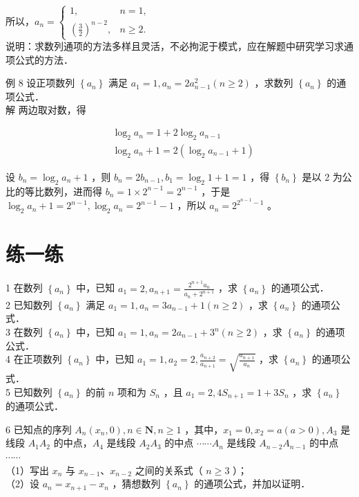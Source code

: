 \documentclass[10pt]{article}
\begin{document}
所以，\(a_{n}= \begin{cases}1, & n=1, \\ \left(\frac{3}{2}\right)^{n-2}, & n \geqslant 2 .\end{cases}\)\\
说明：求数列通项的方法多样且灵活，不必拘泥于模式，应在解题中研究学习求通项公式的方法．

例 8 设正项数列 \(\left\{a_{n}\right\}\) 满足 \(a_{1}=1, a_{n}=2 a_{n-1}^{2}(n \geqslant 2)\) ，求数列 \(\left\{a_{n}\right\}\) 的通项公式．\\
解 两边取对数，得

\[
\begin{aligned}
& \log _{2} a_{n}=1+2 \log _{2} a_{n-1} \\
& \log _{2} a_{n}+1=2\left(\log _{2} a_{n-1}+1\right)
\end{aligned}
\]

设 \(b_{n}=\log _{2} a_{n}+1\) ，则 \(b_{n}=2 b_{n-1}, b_{1}=\log _{2} 1+1=1\) ，得 \(\left\{b_{n}\right\}\) 是以 2 为公比的等比数列，进而得 \(b_{n}=1 \times 2^{n-1}=2^{n-1}\) ，于是 \(\log _{2} a_{n}+1=2^{n-1}, \log _{2} a_{n}=2^{n-1}-1\) ，所以 \(a_{n}=2^{2^{n-1}-1}\) 。

\section*{练一练}
1 在数列 \(\left\{a_{n}\right\}\) 中，已知 \(a_{1}=2, a_{n+1}=\frac{2^{n+1} a_{n}}{a_{n}+2^{n+1}}\) ，求 \(\left\{a_{n}\right\}\) 的通项公式．\\
2 已知数列 \(\left\{a_{n}\right\}\) 满足 \(a_{1}=1, a_{n}=3 a_{n-1}+1(n \geqslant 2)\) ，求 \(\left\{a_{n}\right\}\) 的通项公式．\\
3 在数列 \(\left\{a_{n}\right\}\) 中，已知 \(a_{1}=1, a_{n}=2 a_{n-1}+3^{n}(n \geqslant 2)\) ，求 \(\left\{a_{n}\right\}\) 的通项公式．\\
4 在正项数列 \(\left\{a_{n}\right\}\) 中，已知 \(a_{1}=1, a_{2}=2, \frac{a_{n+2}}{a_{n+1}}=\sqrt{\frac{a_{n+1}}{a_{n}}}\) ，求 \(\left\{a_{n}\right\}\) 的通项公式．\\
5 已知数列 \(\left\{a_{n}\right\}\) 的前 \(n\) 项和为 \(S_{n}\) ，且 \(a_{1}=2,4 S_{n+1}=1+3 S_{n}\) ，求 \(\left\{a_{n}\right\}\) 的通项公式．

6 已知点的序列 \(A_{n}\left(x_{n}, 0\right), n \in \mathbf{N}, n \geqslant 1\) ，其中，\(x_{1}=0, x_{2}=a(a>0), A_{3}\) 是线段 \(A_{1} A_{2}\) 的中点，\(A_{4}\) 是线段 \(A_{2} A_{3}\) 的中点 \(\cdots \cdots A_{n}\) 是线段 \(A_{n-2} A_{n-1}\) 的中点 \(\cdots \cdots\)\\
（1）写出 \(x_{n}\) 与 \(x_{n-1} 、 x_{n-2}\) 之间的关系式（ \(n \geqslant 3\) ）；\\
（2）设 \(a_{n}=x_{n+1}-x_{n}\) ，猜想数列 \(\left\{a_{n}\right\}\) 的通项公式，并加以证明．
\end{document}

